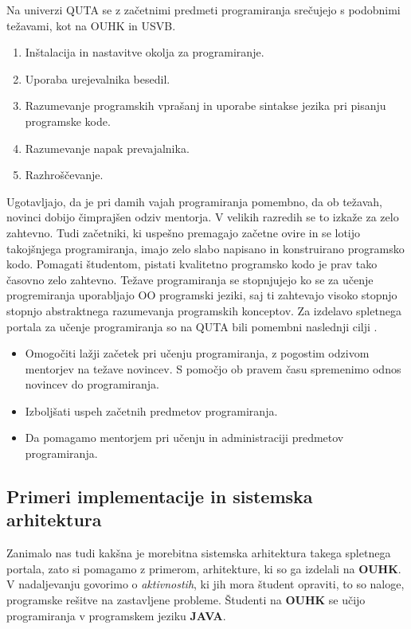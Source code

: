 Na univerzi QUTA se z začetnimi predmeti programiranja srečujejo s
podobnimi težavami, kot na OUHK in USVB.

\begin{enumerate}
\tightlist
\item Inštalacija in nastavitve okolja za programiranje.
\item Uporaba urejevalnika besedil.
\item Razumevanje programskih vprašanj in uporabe sintakse jezika pri
  pisanju programske kode.
\item Razumevanje napak prevajalnika.
\item Razhroščevanje.
\end{enumerate}

Ugotavljajo, da je pri damih vajah programiranja pomembno, da ob
težavah, novinci dobijo čimprajšen odziv mentorja. V velikih razredih
se to izkaže za zelo zahtevno. Tudi začetniki, ki uspešno premagajo
začetne ovire in se lotijo takojšnjega programiranja, imajo zelo slabo
napisano in konstruirano programsko kodo. Pomagati študentom, pistati
kvalitetno programsko kodo je prav tako časovno zelo zahtevno. Težave
programiranja se stopnjujejo ko se za učenje progremiranja uporabljajo
OO programski jeziki, saj ti zahtevajo visoko stopnjo stopnjo
abstraktnega razumevanja programskih konceptov. Za izdelavo spletnega
portala za učenje programiranja so na QUTA bili pomembni naslednji
cilji \cite{thesisAWebP}.

\begin{itemize}
\item Omogočiti lažji začetek pri učenju programiranja, z pogostim
  odzivom mentorjev na težave novincev. S pomočjo ob pravem času
  spremenimo odnos novincev do programiranja.
\item Izboljšati uspeh začetnih predmetov programiranja.
\item Da pomagamo mentorjem pri učenju in administraciji predmetov
  programiranja.
\end{itemize}

\subsection{Primeri implementacije in sistemska arhitektura}
\label{sec:sistemska_arhitektura_All}

Zanimalo nas tudi kakšna je morebitna sistemska arhitektura takega
spletnega portala, zato si pomagamo z primerom, arhitekture, ki so ga
izdelali na \textbf{OUHK}.  V nadaljevanju govorimo o
\emph{aktivnostih}, ki jih mora študent opraviti, to so naloge,
programske rešitve na zastavljene probleme. Študenti na \textbf{OUHK}
se učijo programiranja v programskem jeziku \textbf{JAVA}.

